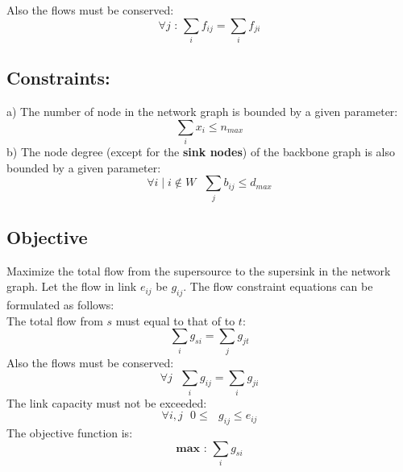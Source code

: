 \documentclass[letterpaper, 12pt]{article}
\begin{document}
Also the flows must be conserved:
\begin{equation}
	\forall j \mbox{ : } \sum_i f_{ij} = \sum_i f_{ji}
\end{equation}
\subsection*{Constraints:} a) The number of node in the network graph is bounded
by a given parameter:
\begin{equation}
	\sum_i x_i \leq n_{max}
\end{equation}
b) The node degree (except for the \textbf{sink nodes}) of the backbone graph is
also bounded by a given parameter:
\begin{equation}
	\forall i \mid i \notin W \mbox{ } \sum_j b_{ij}  \leq d_{max}
\end{equation}
\subsection*{Objective}
Maximize the total flow from the supersource to the supersink in the network
graph. Let the flow in link $e_{ij}$ be $g_{ij}$. The flow constraint equations
can be formulated as follows:\\
The total flow from $s$ must equal to that of to $t$:
\begin{equation}
	\sum_i g_{si} = \sum_j g_{jt}
\end{equation}
Also the flows must be conserved:
\begin{equation}
	\forall j \mbox{  } \sum_i g_{ij} = \sum_i g_{ji}
\end{equation}
{%
The link capacity must not be exceeded:
\begin{equation}
	\forall i,j \mbox{  } 0 \leq \mbox{ } g_{ij} \leq e_{ij}
\end{equation}
}
The objective function is:
\begin{equation}
	\mathbf{max} \mbox{ : }\sum_i g_{si}
\end{equation}
\end{document}
